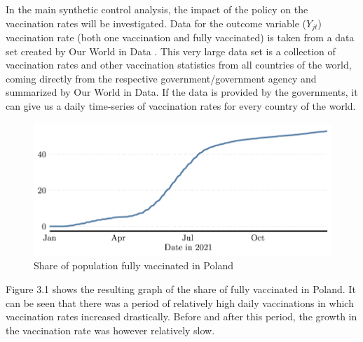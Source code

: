 \documentclass{scrbook}
\begin{document}
In the main synthetic control analysis, the impact of the policy on the
vaccination rates will be investigated. Data for the outcome variable
(\(Y_{jt}\)) vaccination rate (both one vaccination and fully
vaccinated) is taken from a data set created by Our World in Data
\parencite{mathieu_global_2021}. This very large data set is a
collection of vaccination rates and other vaccination statistics from
all countries of the world, coming directly from the respective
government/government agency and summarized by Our World in Data. If the
data is provided by the governments, it can give us a daily time-series
of vaccination rates for every country of the world.

\begin{figure}[h]
\caption{Share of population fully vaccinated in Poland}

\begin{center}\includegraphics{bachelor_thesis_files/figure-latex/unnamed-chunk-2-1} \end{center}
\end{figure}

Figure 3.1 shows the resulting graph of the share of fully vaccinated in
Poland. It can be seen that there was a period of relatively high daily
vaccinations in which vaccination rates increased drastically. Before
and after this period, the growth in the vaccination rate was however
relatively slow.
\end{document}
